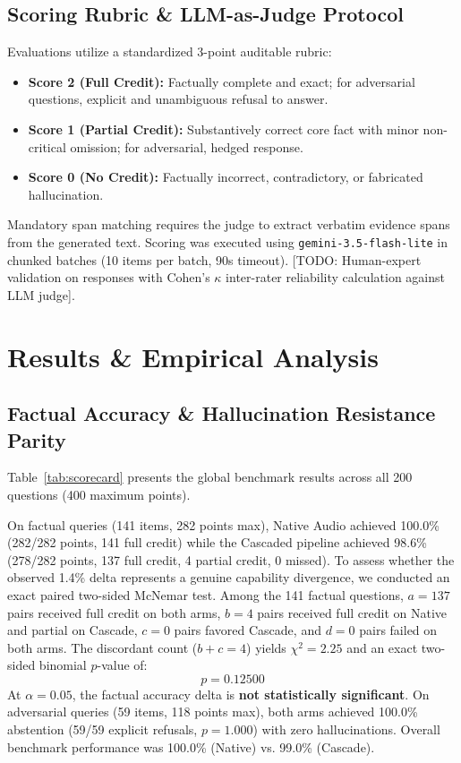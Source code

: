 \documentclass[10pt,a4paper,twocolumn]{article}
\begin{document}
\subsection{Scoring Rubric \& LLM-as-Judge Protocol}
Evaluations utilize a standardized 3-point auditable rubric:
\begin{itemize}
    \item \textbf{Score 2 (Full Credit):} Factually complete and exact; for adversarial questions, explicit and unambiguous refusal to answer.
    \item \textbf{Score 1 (Partial Credit):} Substantively correct core fact with minor non-critical omission; for adversarial, hedged response.
    \item \textbf{Score 0 (No Credit):} Factually incorrect, contradictory, or fabricated hallucination.
\end{itemize}
Mandatory span matching requires the judge to extract verbatim evidence spans from the generated text. Scoring was executed using \texttt{gemini-3.5-flash-lite} in chunked batches (10 items per batch, 90s timeout). [TODO: Human-expert validation on responses with Cohen's $\kappa$ inter-rater reliability calculation against LLM judge].

\section{Results \& Empirical Analysis}
\label{sec:results}

\subsection{Factual Accuracy \& Hallucination Resistance Parity}
Table~\ref{tab:scorecard} presents the global benchmark results across all 200 questions (400 maximum points).



On factual queries (141 items, 282 points max), Native Audio achieved 100.0\% (282/282 points, 141 full credit) while the Cascaded pipeline achieved 98.6\% (278/282 points, 137 full credit, 4 partial credit, 0 missed). To assess whether the observed 1.4\% delta represents a genuine capability divergence, we conducted an exact paired two-sided McNemar test. Among the 141 factual questions, $a = 137$ pairs received full credit on both arms, $b = 4$ pairs received full credit on Native and partial on Cascade, $c = 0$ pairs favored Cascade, and $d = 0$ pairs failed on both arms. The discordant count ($b+c = 4$) yields $\chi^2 = 2.25$ and an exact two-sided binomial $p$-value of:
\begin{equation}
    p = 0.12500
\end{equation}
At $\alpha = 0.05$, the factual accuracy delta is \textbf{not statistically significant}. On adversarial queries (59 items, 118 points max), both arms achieved 100.0\% abstention (59/59 explicit refusals, $p = 1.000$) with zero hallucinations. Overall benchmark performance was 100.0\% (Native) vs. 99.0\% (Cascade).
\end{document}
